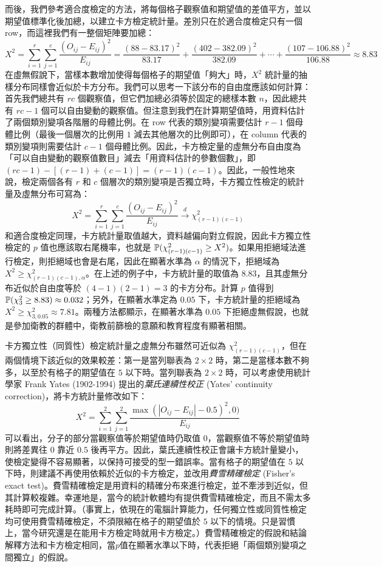     而後，我們參考適合度檢定的方法，將每個格子觀察值和期望值的差值平方，並以期望值標準化後加總，以建立卡方檢定統計量。差別只在於適合度檢定只有一個 row，而這裡我們有一整個矩陣要加總：
    \smallskip
    \[X^2 = \sum_{i=1}^r \sum_{j=1}^c \frac{(O_{ij}-E_{ij})^2}{E_{ij}} = \frac{(88-83.17)^2}{83.17} + \frac{(402-382.09)^2}{382.09} + \cdots + \frac{(107-106.88)^2}{106.88} \approx 8.83\]
    \smallskip
    在虛無假說下，當樣本數增加使得每個格子的期望值「夠大」時，$X^2$ 統計量的抽樣分布同樣會近似於卡方分布。我們可以思考一下該分布的自由度應該如何計算：首先我們總共有 $rc$ 個觀察值，但它們加總必須等於固定的總樣本數 $n$，因此總共有 $rc - 1$ 個可以自由變動的觀察值。但注意到我們在計算期望值時，用資料估計了兩個類別變項各階層的母體比例。在 row 代表的類別變項需要估計 $r-1$ 個母體比例（最後一個層次的比例用 $1$ 減去其他層次的比例即可），在 column 代表的類別變項則需要估計 $c-1$ 個母體比例。因此，卡方檢定量的虛無分布自由度為「可以自由變動的觀察值數目」減去「用資料估計的參數個數」，即$(rc-1) - [(r-1) + (c-1)] = (r-1)(c-1)$。因此，一般性地來說，檢定兩個各有 $r$ 和 $c$ 個層次的類別變項是否獨立時，卡方獨立性檢定的統計量及虛無分布可寫為：
    \smallskip
    \[X^2 = \sum_{i=1}^r \sum_{j=1}^c \frac{(O_{ij}-E_{ij})^2}{E_{ij}} \xrightarrow[]{d} \chi^2_{(r-1)(c-1)}\]
    \smallskip
    和適合度檢定同理，卡方統計量取值越大，資料越偏向對立假說，因此卡方獨立性檢定的 $p$ 值也應該取右尾機率，也就是 $\mathbb{P}(\chi^2_{(r-1)(c-1)} \ge X^2)$。如果用拒絕域法進行檢定，則拒絕域也會是右尾，因此在顯著水準為 $\alpha$ 的情況下，拒絕域為 $X^2 \ge \chi^2_{(r-1)(c-1), \alpha}$。在上述的例子中，卡方統計量的取值為 $8.83$，且其虛無分布近似於自由度等於 $(4-1)(2-1) = 3$ 的卡方分布。計算 $p$ 值得到 $\mathbb{P}(\chi^2_3 \ge 8.83) \approx 0.032$；另外，在顯著水準定為 $0.05$ 下，卡方統計量的拒絕域為 $X^2 \ge \chi^2_{3,0.05} \approx 7.81$。兩種方法都顯示，在顯著水準為 $0.05$ 下拒絕虛無假說，也就是參加衛教的群體中，衛教前篩檢的意願和教育程度有顯著相關。

    \medskip

    卡方獨立性（同質性）檢定統計量之虛無分布雖然可近似為 $\chi^2_{(r-1)(c-1)}$，但在兩個情境下該近似的效果較差：第一是當列聯表為 $2 \times 2$ 時，第二是當樣本數不夠多，以至於有格子的期望值在 $5$ 以下時。當列聯表為 $2 \times 2$ 時，可以考慮使用統計學家 Frank Yates (1902-1994) 提出的\textit{葉氏連續性校正} (Yates' continuity correction)，將卡方統計量修改如下：
    \smallskip
    \[X^2 = \sum_{i=1}^2 \sum_{j=1}^2 \frac{\max(|O_{ij}-E_{ij}|-0.5)^2,0)}{E_{ij}}\]
    \smallskip
    可以看出，分子的部分當觀察值等於期望值時仍取值 $0$，當觀察值不等於期望值時則將差異往 $0$ 靠近 $0.5$ 後再平方。因此，葉氏連續性校正會讓卡方統計量變小，使檢定變得不容易顯著，以保持可接受的型一錯誤率。當有格子的期望值在 $5$ 以下時，則建議不再使用依賴於近似的卡方檢定，並改用\textit{費雪精確檢定} (Fisher's exact test)。費雪精確檢定是用資料的精確分布來進行檢定，並不牽涉到近似，但其計算較複雜。幸運地是，當今的統計軟體均有提供費雪精確檢定，而且不需太多耗時即可完成計算。（事實上，依現在的電腦計算能力，任何獨立性或同質性檢定均可使用費雪精確檢定，不須限縮在格子的期望值於 $5$ 以下的情境。只是習慣上，當今研究還是在能用卡方檢定時就用卡方檢定。）費雪精確檢定的假說和結論解釋方法和卡方檢定相同，當$p$值在顯著水準以下時，代表拒絕「兩個類別變項之間獨立」的假說。
    
